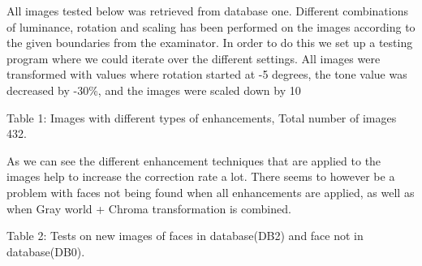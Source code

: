 All images tested below was retrieved from database one. Different combinations of luminance, rotation and scaling has been performed on the images according to the given boundaries from the examinator. In order to do this we set up a testing program where we could iterate over the different settings. All images were transformed with values where rotation started at -5 degrees, the tone value was decreased by -30\%, and the images were scaled down by 10%


Table 1: Images with different types of enhancements, Total number of images 432.

As we can see the different enhancement techniques that are applied to the images help to increase the correction rate a lot. There seems to however be a problem with faces not being found when all enhancements are applied, as well as when Gray world + Chroma transformation is combined.

Table 2: Tests on new images of faces in database(DB2) and face not in database(DB0).
